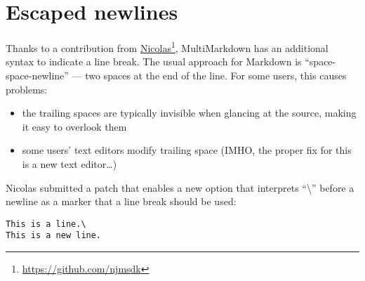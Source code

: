 
\def\mytitle{Escaped Newlines}
\def\myauthor{Fletcher T. Penney}
\def\revised{2018-06-30}




\tableofcontents

\section{Escaped newlines}
\label{escapednewlines}

Thanks to a contribution from \href{https://github.com/njmsdk}{Nicolas}\footnote{\href{https://github.com/njmsdk}{https:\slash \slash github.com\slash njmsdk}}, MultiMarkdown has an additional syntax to indicate a line break. The usual approach for Markdown is ``space-space-newline'' --- two spaces at the end of the line. For some users, this causes problems:

\begin{itemize}
\item the trailing spaces are typically invisible when glancing at the source, making it easy to overlook them

\item some users' text editors modify trailing space (IMHO, the proper fix for this is a new text editor{\ldots})

\end{itemize}

Nicolas submitted a patch that enables a new option that interprets ``\textbackslash{}'' before a newline as a marker that a line break should be used:

\begin{verbatim}
This is a line.\
This is a new line.
\end{verbatim}



